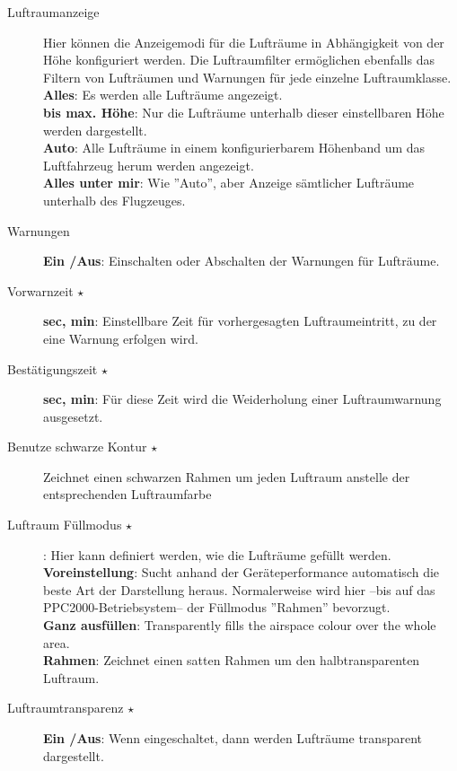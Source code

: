 \begin{description}
\item[Luftraumanzeige]  Hier können die Anzeigemodi für die Lufträume in
Abhängigkeit von der Höhe konfiguriert werden.
Die Luftraumfilter ermöglichen ebenfalls das Filtern von Lufträumen und Warnungen für jede
einzelne Luftraumklasse. \\
  {\bf Alles}: Es werden alle Lufträume angezeigt.\\
  {\bf bis max. Höhe}: Nur die Lufträume unterhalb dieser einstellbaren Höhe werden dargestellt.\\
  {\bf Auto}: Alle Lufträume in einem konfigurierbarem Höhenband um das Luftfahrzeug herum werden angezeigt.
 \\
  {\bf Alles unter mir}:  Wie ''Auto'', aber Anzeige sämtlicher Lufträume unterhalb des Flugzeuges.
\item[Warnungen]  {\bf Ein /Aus}:  Einschalten oder Abschalten der Warnungen für Lufträume.
\item[Vorwarnzeit $\star$]  {\bf sec, min}: Einstellbare Zeit für vorhergesagten Luftraumeintritt, zu der eine Warnung erfolgen wird.
\item[Bestätigungszeit $\star$]  {\bf sec, min}: Für diese Zeit wird die Weiderholung einer Luftraumwarnung ausgesetzt.
\item[Benutze schwarze Kontur $\star$] Zeichnet einen schwarzen Rahmen um jeden Luftraum anstelle der entsprechenden Luftraumfarbe
\item[Luftraum Füllmodus $\star$]  {\bf }:  Hier kann definiert werden, wie die Lufträume gefüllt werden.\\
   {\bf Voreinstellung}: Sucht anhand der Geräteperformance automatisch die beste Art der Darstellung heraus.
    Normalerweise wird hier --bis auf das PPC2000-Betriebsystem-- der Füllmodus ''Rahmen'' bevorzugt.\\
    {\bf Ganz ausfüllen}:  Transparently fills the airspace colour over the whole area. \\
    {\bf Rahmen}: Zeichnet einen satten Rahmen um den halbtransparenten Luftraum. \\
\item[Luftraumtransparenz $\star$]  {\bf Ein /Aus}: Wenn eingeschaltet, dann werden Lufträume transparent dargestellt.
\end{description}

